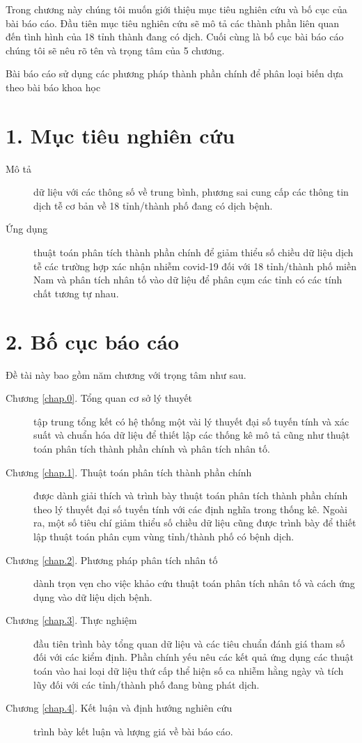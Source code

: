 


Trong chương này chúng tôi muốn giới thiệu mục tiêu nghiên cứu và bố cục của bài báo cáo. Đầu tiên mục tiêu nghiên cứu sẽ mô tả các thành phần liên quan đến tình hình của 18 tỉnh thành đang có dịch. Cuối cùng là bố cục bài báo cáo chúng tôi sẽ nêu rõ tên và trọng tâm của 5 chương.

Bài báo cáo sử dụng các phương pháp thành phần chính để phân loại biến dựa theo bài báo khoa học \cite{ref}
\section*{1. Mục tiêu nghiên cứu}


\begin{description}
	\item[Mô tả] dữ liệu với các thông số về trung bình, phương sai cung cấp các thông tin dịch tễ cơ bản về 18 tỉnh/thành phố đang có dịch bệnh.
	\item[Ứng dụng] thuật toán phân tích thành phần chính để giảm thiểu số chiều dữ liệu dịch tễ các trường hợp xác nhận nhiễm covid-19 đối với 18 tỉnh/thành phố miền Nam và phân tích nhân tố vào dữ liệu để phân cụm các tỉnh có các tính chất tương tự nhau.
\end{description}

\section*{2. Bố cục báo cáo}

Đề tài này bao gồm năm chương với trọng tâm như sau.

\begin{description}
	\item[Chương \ref{chap.0}. Tổng quan cơ sở lý thuyết] tập trung tổng kết có hệ thống một vài lý thuyết đại số tuyến tính và xác suất và chuẩn hóa dữ liệu để thiết lập các thống kê mô tả cũng như thuật toán phân tích thành phần chính và phân tích nhân tố. 
	\item[Chương \ref{chap.1}. Thuật toán phân tích thành phần chính] được dành giải thích và trình bày thuật toán phân tích thành phần chính theo lý thuyết đại số tuyến tính với các định nghĩa trong thống kê. Ngoài ra, một số tiêu chí giảm thiểu số chiều dữ liệu cũng được trình bày để thiết lập thuật toán phân cụm vùng tỉnh/thành phố có bệnh dịch. 
	\item[Chương \ref{chap.2}. Phương pháp phân tích nhân tố] dành trọn vẹn cho việc khảo cứu thuật toán phân tích nhân tố và cách ứng dụng vào dữ liệu dịch bệnh.
	\item[Chương \ref{chap.3}. Thực nghiệm] đầu tiên trình bày tổng quan dữ liệu và các tiêu chuẩn đánh giá tham số đối với các kiểm định. Phần chính yếu nêu các kết quả ứng dụng các thuật toán vào hai loại dữ liệu thứ cấp thể hiện số ca nhiễm hằng ngày và tích lũy đối với các tỉnh/thành phố đang bùng phát dịch.
	\item[Chương \ref{chap.4}. Kết luận và định hướng nghiên cứu] trình bày kết luận và lượng giá về bài báo cáo.
\end{description}









